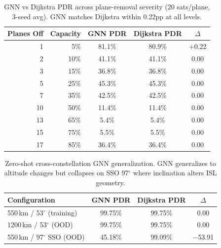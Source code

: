 \begin{table}[t]
\centering
\caption{GNN vs Dijkstra PDR across plane-removal severity (20 sats/plane, 3-seed avg). GNN matches Dijkstra within 0.22pp at all levels.}
\label{tab:topology_sweep}
\begin{tabular}{rrccc}
\toprule
\textbf{Planes Off} & \textbf{Capacity} & \textbf{GNN PDR} & \textbf{Dijkstra PDR} & \textbf{$\Delta$} \\
\midrule
1  & 5\%  & 81.1\% & 80.9\% & +0.22 \\
2  & 10\% & 41.1\% & 41.1\% & 0.00 \\
3  & 15\% & 36.8\% & 36.8\% & 0.00 \\
5  & 25\% & 45.3\% & 45.3\% & 0.00 \\
7  & 35\% & 42.5\% & 42.5\% & 0.00 \\
10 & 50\% & 11.4\% & 11.4\% & 0.00 \\
13 & 65\% & 5.4\%  & 5.4\%  & 0.00 \\
15 & 75\% & 5.5\%  & 5.5\%  & 0.00 \\
17 & 85\% & 36.4\% & 36.4\% & 0.00 \\
\bottomrule
\end{tabular}
\end{table}

\begin{table}[t]
\centering
\caption{Zero-shot cross-constellation GNN generalization. GNN generalizes to altitude changes but collapses on SSO 97$^\circ$ where inclination alters ISL geometry.}
\label{tab:cross_constellation}
\begin{tabular}{lccc}
\toprule
\textbf{Configuration} & \textbf{GNN PDR} & \textbf{Dijkstra PDR} & \textbf{$\Delta$} \\
\midrule
550\,km / 53$^\circ$ (training) & 99.75\% & 99.75\% & 0.00 \\
1200\,km / 53$^\circ$ (OOD)     & 99.75\% & 99.75\% & 0.00 \\
550\,km / 97$^\circ$ SSO (OOD)  & 45.18\% & 99.09\% & $-$53.91 \\
\bottomrule
\end{tabular}
\end{table}

